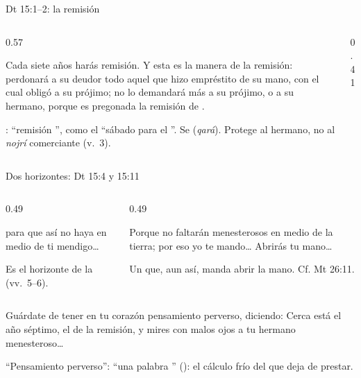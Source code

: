\begin{frame}{Dt 15:1--2: la remisión}
\begin{columns}[c,onlytextwidth]
\begin{column}{0.57\textwidth}
\begin{cita}Cada siete años harás remisión. Y esta es la manera de la remisión: perdonará a su deudor todo aquel que hizo empréstito de su mano, con el cual obligó a su prójimo; no lo demandará más a su prójimo, o a su hermano, porque es pregonada la remisión de \SENOR.\end{cita}
\scriptsize {}: ``remisión '', como el ``sábado para el \SENOR''. Se  (\emph{qará}). Protege al hermano, no al \emph{nojrí} comerciante (v.~3).
\end{column}
\begin{column}{0.41\textwidth}\end{column}
\end{columns}
\end{frame}

\begin{frame}{Dos horizontes: Dt 15:4 y 15:11}
\begin{columns}[t,onlytextwidth]
\begin{column}{0.49\textwidth}
\centering{}
\begin{cita}para que así no haya en medio de ti mendigo\ldots{}\end{cita}
\scriptsize Es el horizonte de la  (vv.~5--6).
\end{column}
\begin{column}{0.49\textwidth}
\centering{}
\begin{cita}Porque no faltarán menesterosos en medio de la tierra; por eso yo te mando\ldots{} Abrirás tu mano\ldots{}\end{cita}
\scriptsize Un  que, aun así, manda abrir la mano. Cf. Mt 26:11.
\end{column}
\end{columns}\medskip
\begin{cita}Guárdate de tener en tu corazón pensamiento perverso, diciendo: Cerca está el año séptimo, el de la remisión, y mires con malos ojos a tu hermano menesteroso\ldots{}\end{cita}
\scriptsize ``Pensamiento perverso'': ``una palabra '' (): el cálculo frío del que deja de prestar.
\end{frame}

